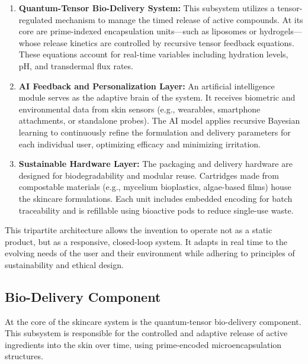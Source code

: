 \documentclass{article}
\theoremstyle{plain}
\theoremstyle{claimstyle}
\begin{document}
\begin{enumerate}
    \item \textbf{Quantum-Tensor Bio-Delivery System:}  
    This subsystem utilizes a tensor-regulated mechanism to manage the timed release of active compounds. At its core are prime-indexed encapsulation units—such as liposomes or hydrogels—whose release kinetics are controlled by recursive tensor feedback equations. These equations account for real-time variables including hydration levels, pH, and transdermal flux rates.

    \item \textbf{AI Feedback and Personalization Layer:}  
    An artificial intelligence module serves as the adaptive brain of the system. It receives biometric and environmental data from skin sensors (e.g., wearables, smartphone attachments, or standalone probes). The AI model applies recursive Bayesian learning to continuously refine the formulation and delivery parameters for each individual user, optimizing efficacy and minimizing irritation.

    \item \textbf{Sustainable Hardware Layer:}  
    The packaging and delivery hardware are designed for biodegradability and modular reuse. Cartridges made from compostable materials (e.g., mycelium bioplastics, algae-based films) house the skincare formulations. Each unit includes embedded encoding for batch traceability and is refillable using bioactive pods to reduce single-use waste.
\end{enumerate}

This tripartite architecture allows the invention to operate not as a static product, but as a responsive, closed-loop system. It adapts in real time to the evolving needs of the user and their environment while adhering to principles of sustainability and ethical design.

\subsection{Bio-Delivery Component}

At the core of the skincare system is the quantum-tensor bio-delivery component. This subsystem is responsible for the controlled and adaptive release of active ingredients into the skin over time, using prime-encoded microencapsulation structures.
\end{document}
